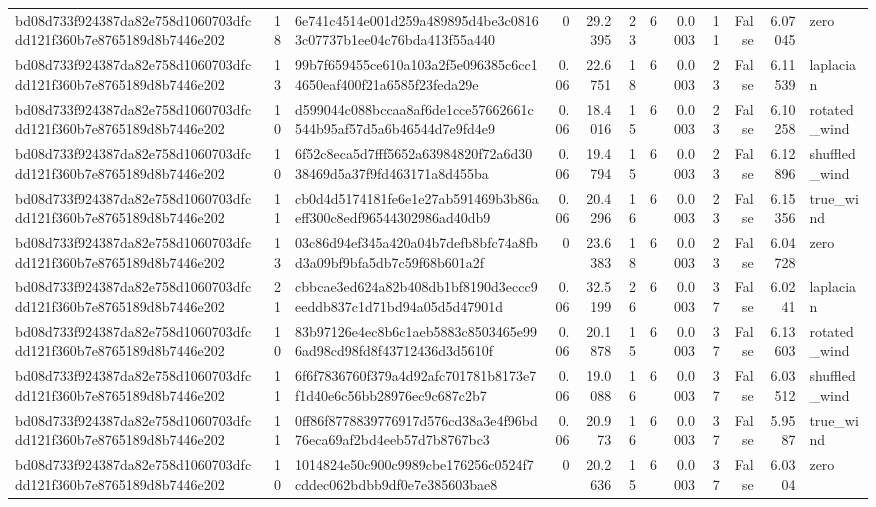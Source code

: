 \begin{tabular}{lrlrrrrrrrrl}
bd08d733f924387da82e758d1060703dfcdd121f360b7e8765189d8b7446e202 & 18 & 6e741c4514e001d259a489895d4be3c08163c07737b1ee04c76bda413f55a440 & 0 & 29.2395 & 23 & 6 & 0.0003 & 11 & False & 6.07045 & zero \\
bd08d733f924387da82e758d1060703dfcdd121f360b7e8765189d8b7446e202 & 13 & 99b7f659455ce610a103a2f5e096385c6cc14650eaf400f21a6585f23feda29e & 0.06 & 22.6751 & 18 & 6 & 0.0003 & 23 & False & 6.11539 & laplacian \\
bd08d733f924387da82e758d1060703dfcdd121f360b7e8765189d8b7446e202 & 10 & d599044c088bccaa8af6de1cce57662661c544b95af57d5a6b46544d7e9fd4e9 & 0.06 & 18.4016 & 15 & 6 & 0.0003 & 23 & False & 6.10258 & rotated\_wind \\
bd08d733f924387da82e758d1060703dfcdd121f360b7e8765189d8b7446e202 & 10 & 6f52c8eca5d7fff5652a63984820f72a6d3038469d5a37f9fd463171a8d455ba & 0.06 & 19.4794 & 15 & 6 & 0.0003 & 23 & False & 6.12896 & shuffled\_wind \\
bd08d733f924387da82e758d1060703dfcdd121f360b7e8765189d8b7446e202 & 11 & cb0d4d5174181fe6e1e27ab591469b3b86aeff300c8edf96544302986ad40db9 & 0.06 & 20.4296 & 16 & 6 & 0.0003 & 23 & False & 6.15356 & true\_wind \\
bd08d733f924387da82e758d1060703dfcdd121f360b7e8765189d8b7446e202 & 13 & 03c86d94ef345a420a04b7defb8bfc74a8fbd3a09bf9bfa5db7c59f68b601a2f & 0 & 23.6383 & 18 & 6 & 0.0003 & 23 & False & 6.04728 & zero \\
bd08d733f924387da82e758d1060703dfcdd121f360b7e8765189d8b7446e202 & 21 & cbbcae3ed624a82b408db1bf8190d3eccc9eeddb837c1d71bd94a05d5d47901d & 0.06 & 32.5199 & 26 & 6 & 0.0003 & 37 & False & 6.0241 & laplacian \\
bd08d733f924387da82e758d1060703dfcdd121f360b7e8765189d8b7446e202 & 10 & 83b97126e4ec8b6c1aeb5883c8503465e996ad98cd98fd8f43712436d3d5610f & 0.06 & 20.1878 & 15 & 6 & 0.0003 & 37 & False & 6.13603 & rotated\_wind \\
bd08d733f924387da82e758d1060703dfcdd121f360b7e8765189d8b7446e202 & 11 & 6f6f7836760f379a4d92afc701781b8173e7f1d40e6c56bb28976ec9c687c2b7 & 0.06 & 19.0088 & 16 & 6 & 0.0003 & 37 & False & 6.03512 & shuffled\_wind \\
bd08d733f924387da82e758d1060703dfcdd121f360b7e8765189d8b7446e202 & 11 & 0ff86f8778839776917d576cd38a3e4f96bd76eca69af2bd4eeb57d7b8767bc3 & 0.06 & 20.973 & 16 & 6 & 0.0003 & 37 & False & 5.9587 & true\_wind \\
bd08d733f924387da82e758d1060703dfcdd121f360b7e8765189d8b7446e202 & 10 & 1014824e50c900c9989cbe176256c0524f7cddec062bdbb9df0e7e385603bae8 & 0 & 20.2636 & 15 & 6 & 0.0003 & 37 & False & 6.0304 & zero \\

\end{tabular}
